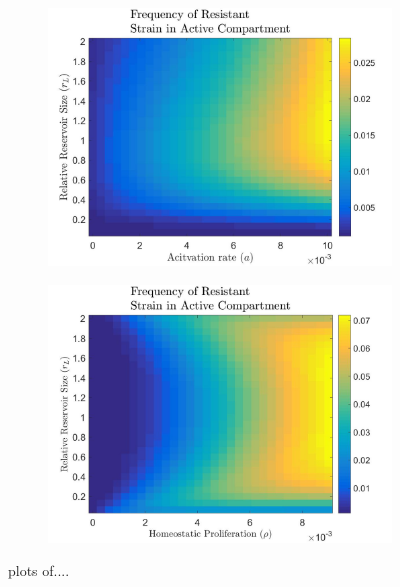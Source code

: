 \documentclass[DIV=15]{scrartcl}
\begin{document}
\begin{figure}
\begin{subfigure}{.5\textwidth}
  \centering
  \includegraphics[width=.8\linewidth]{FrequencyofResistantStraininActiveCompartment_19_04a.jpg}
\end{subfigure}%
\begin{subfigure}{.5\textwidth}
  \centering
  \includegraphics[width=.8\linewidth]{FrequencyofResistantStraininActiveCompartment_19_04b.jpg}
\end{subfigure}
\caption{plots of....}
\label{fig:fig}
\end{figure}

\fi

 
\end{document}

